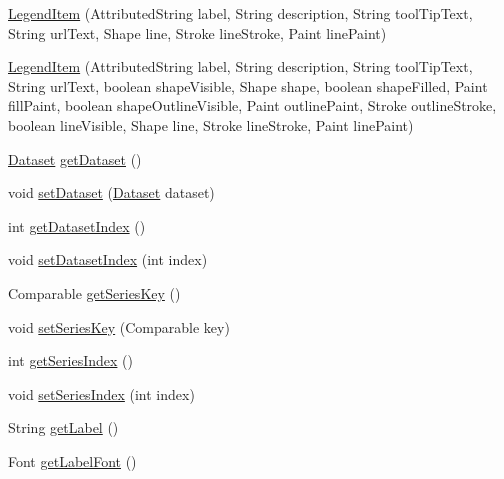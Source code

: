 \begin{DoxyCompactItemize}
\mbox{\hyperlink{classorg_1_1jfree_1_1chart_1_1_legend_item_a428deece379a23fb067172846bebdff7}{Legend\+Item}} (Attributed\+String label, String description, String tool\+Tip\+Text, String url\+Text, Shape line, Stroke line\+Stroke, Paint line\+Paint)
\item 
\mbox{\hyperlink{classorg_1_1jfree_1_1chart_1_1_legend_item_ac4eac8a27718c61aaffb10b75de088c0}{Legend\+Item}} (Attributed\+String label, String description, String tool\+Tip\+Text, String url\+Text, boolean shape\+Visible, Shape shape, boolean shape\+Filled, Paint fill\+Paint, boolean shape\+Outline\+Visible, Paint outline\+Paint, Stroke outline\+Stroke, boolean line\+Visible, Shape line, Stroke line\+Stroke, Paint line\+Paint)
\item 
\mbox{\hyperlink{interfaceorg_1_1jfree_1_1data_1_1general_1_1_dataset}{Dataset}} \mbox{\hyperlink{classorg_1_1jfree_1_1chart_1_1_legend_item_a5213895f13ab94372d048ea13d2f0146}{get\+Dataset}} ()
\item 
void \mbox{\hyperlink{classorg_1_1jfree_1_1chart_1_1_legend_item_ae7b3428f8a2c602ca6a6915a62b184eb}{set\+Dataset}} (\mbox{\hyperlink{interfaceorg_1_1jfree_1_1data_1_1general_1_1_dataset}{Dataset}} dataset)
\item 
int \mbox{\hyperlink{classorg_1_1jfree_1_1chart_1_1_legend_item_a211d17c1d0c314e7445cbd574cbafb41}{get\+Dataset\+Index}} ()
\item 
void \mbox{\hyperlink{classorg_1_1jfree_1_1chart_1_1_legend_item_a34b68265023efe9e950bb9fa8cc927dc}{set\+Dataset\+Index}} (int index)
\item 
Comparable \mbox{\hyperlink{classorg_1_1jfree_1_1chart_1_1_legend_item_ad46fd38c171d5dc28937401079a447c7}{get\+Series\+Key}} ()
\item 
void \mbox{\hyperlink{classorg_1_1jfree_1_1chart_1_1_legend_item_abaaa01a07ecba893e71c52a54179c087}{set\+Series\+Key}} (Comparable key)
\item 
int \mbox{\hyperlink{classorg_1_1jfree_1_1chart_1_1_legend_item_add79196ffb656e092e5f8f5965dbc364}{get\+Series\+Index}} ()
\item 
void \mbox{\hyperlink{classorg_1_1jfree_1_1chart_1_1_legend_item_a7fd59fcc9af93aac89a1142468588768}{set\+Series\+Index}} (int index)
\item 
String \mbox{\hyperlink{classorg_1_1jfree_1_1chart_1_1_legend_item_a6a470d7f80ace9fbbedbb75af678f84c}{get\+Label}} ()
\item 
Font \mbox{\hyperlink{classorg_1_1jfree_1_1chart_1_1_legend_item_a7939e242876cc988636afd595e47eee7}{get\+Label\+Font}} ()

\end{DoxyCompactItemize}
